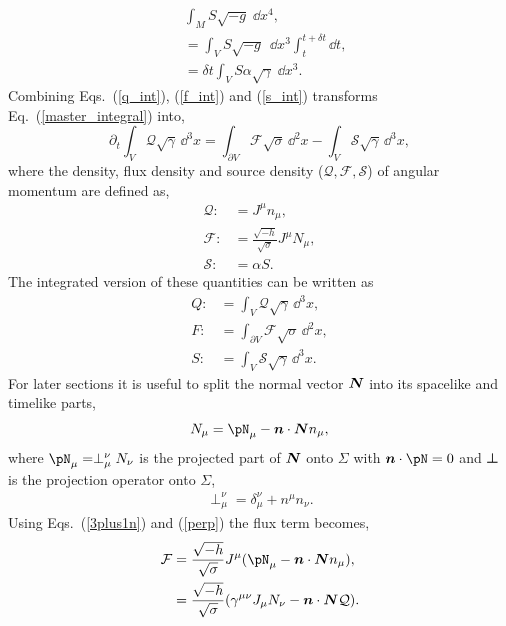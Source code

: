 \begin{align}
&\int_{M} S \sqrt{-g} \;\dd x^4 , \nonumber \\
&=\int_V S \sqrt{-g} \;\,\dd x^3 \int_t^{t+\delta t} \dd t,\\
 \label{s_int}&=\delta t \int_V S \alpha\sqrt{\gamma} \;\dd x^3 .
\end{align}
Combining Eqs.~(\ref{q_int}), (\ref{f_int}) and (\ref{s_int}) transforms Eq.~(\ref{master_integral}) into,
\begin{equation} \label{qfs_system}
\partial_t \int_{V} \mathcal{Q} \sqrt{\gamma} \,\dd^3 x  = \int_{\partial V} \mathcal{F} \sqrt{\sigma} \,\dd^2 x  
 - \int_{V} \mathcal{S} \sqrt{\gamma} \,\dd^3 x,
\end{equation}
where the density, flux density and source density ($\mathcal{Q}, \mathcal{F}, \mathcal{S}$) of angular momentum are defined as,
\begin{align}
\label{q_def}\mathcal{Q} :&= J^\mu n_\mu , \\
\label{flux_def}\mathcal{F} :&= \frac{\sqrt{-h}}{\sqrt{\sigma}}J^\mu N_\mu , \\
\label{source_def}\mathcal{S} :&= \alpha S. 
\end{align} 
The integrated version of these quantities can be written as
\begin{align}
\label{eq:Q_def_int}{Q} :&= \int_V \mathcal{Q}\sqrt{\gamma}\,\dd^3 x , \\
\label{eq:F_def_int}{F} :&= \int_{\partial V}  \mathcal{F}\sqrt{\sigma}\,\dd^2 x , \\
\label{eq:S_def_int}{S} :&= \int_V \mathcal{S}\sqrt{\gamma}\,\dd^3 x. 
\end{align} 
For later sections it is useful to split the normal vector $\boldsymbol{N}$ into its spacelike and timelike parts,
\begin{align}
\label{3plus1n}N_\mu = \pN_\mu - \bs{n} \cdot \bs{N} n_\mu,
\end{align}
where $\pN_\mu = \perp^\nu_\mu N_\nu$ is the projected part of $\boldsymbol{N}$ onto $\Sigma$ with $\bs{n}\cdot \bs{\pN}=0$ and $\boldsymbol{\perp}$ is the projection operator onto $\Sigma$,
\begin{align}
\label{perp} \perp^\nu_\mu = \delta^\nu_\mu + n^\mu n_\nu.
\end{align}
Using Eqs.~(\ref{3plus1n}) and (\ref{perp}) the flux term becomes, 
\begin{align}
\mathcal{F} &= \frac{\sqrt{-h}}{\sqrt{\sigma}}J^\mu (\pN_\mu - \bs{n} \cdot \bs{N} n_\mu), \\
  \label{3plus1f} &= \frac{\sqrt{-h}}{\sqrt{\sigma}} (\gamma^{\mu\nu} J_\mu N_\nu - \bs{n} \cdot \bs{N} \mathcal{Q}).
\end{align}

